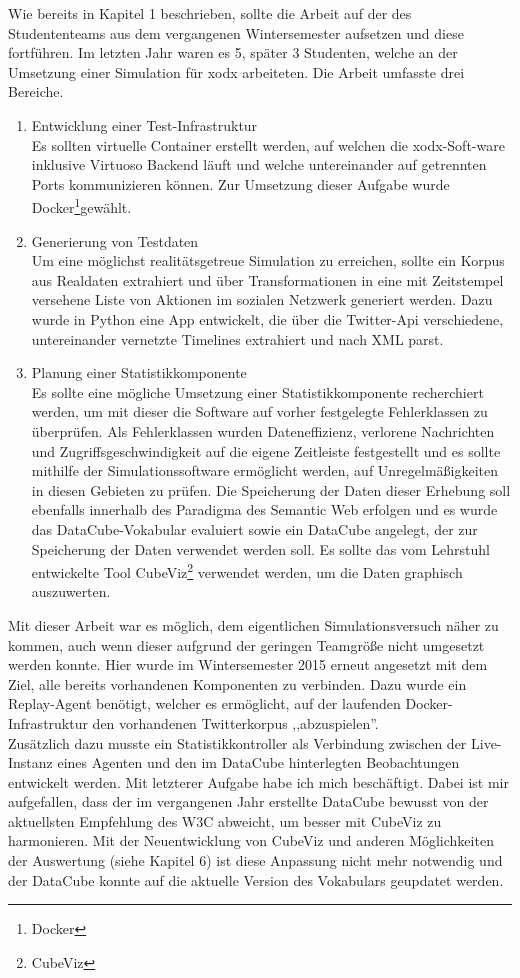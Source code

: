 \documentclass{article}
\begin{document}
Wie bereits in Kapitel 1 beschrieben, sollte die Arbeit auf der des Studententeams aus dem vergangenen Wintersemester aufsetzen und diese fortführen. Im letzten Jahr waren es 5, später 3 Studenten, welche an der Umsetzung einer Simulation für xodx arbeiteten. Die Arbeit umfasste drei Bereiche.
\begin{enumerate}
	\item{Entwicklung einer Test-Infrastruktur\\
	Es sollten virtuelle Container erstellt werden, auf welchen die xodx-Soft-ware inklusive Virtuoso Backend läuft und welche untereinander auf getrennten Ports kommunizieren können. Zur Umsetzung dieser Aufgabe wurde Docker\footnote{Docker}gewählt.}
	\item{Generierung von Testdaten\\
	Um eine möglichst realitätsgetreue Simulation zu erreichen, sollte ein Korpus aus Realdaten extrahiert und über Transformationen in eine mit Zeitstempel versehene Liste von Aktionen im sozialen Netzwerk generiert werden. Dazu wurde in Python eine App entwickelt, die über die Twitter-Api verschiedene, untereinander vernetzte Timelines extrahiert und nach XML parst.}
	\item{Planung einer Statistikkomponente\\
	Es sollte eine mögliche Umsetzung einer Statistikkomponente  recherchiert werden, um mit dieser die Software auf vorher festgelegte Fehlerklassen zu überprüfen. Als Fehlerklassen wurden Dateneffizienz, verlorene Nachrichten und Zugriffsgeschwindigkeit auf die eigene Zeitleiste festgestellt und es sollte mithilfe der Simulationssoftware ermöglicht werden, auf Unregelmäßigkeiten in diesen Gebieten zu prüfen. Die Speicherung der Daten dieser Erhebung soll ebenfalls innerhalb des Paradigma des Semantic Web erfolgen und es wurde das DataCube-Vokabular evaluiert sowie ein DataCube angelegt, der zur Speicherung der Daten verwendet werden soll. Es sollte das vom Lehrstuhl entwickelte Tool CubeViz\footnote{CubeViz} verwendet werden, um die Daten graphisch auszuwerten.}
\end{enumerate}
Mit dieser Arbeit war es möglich, dem eigentlichen Simulationsversuch näher zu kommen, auch wenn dieser aufgrund der geringen Teamgröße nicht umgesetzt werden konnte. Hier wurde im Wintersemester 2015 erneut angesetzt mit dem Ziel, alle bereits vorhandenen Komponenten zu verbinden. Dazu wurde ein Replay-Agent benötigt, welcher es ermöglicht, auf der laufenden Docker-Infrastruktur den vorhandenen Twitterkorpus ,,abzuspielen''.\\
 Zusätzlich dazu musste ein Statistikkontroller als Verbindung zwischen der Live-Instanz eines Agenten und den im DataCube hinterlegten Beobachtungen entwickelt werden. Mit letzterer Aufgabe habe ich mich beschäftigt. Dabei ist mir aufgefallen, dass der im vergangenen Jahr erstellte DataCube bewusst von der aktuellsten Empfehlung des W3C abweicht, um besser mit CubeViz zu harmonieren. Mit der Neuentwicklung von CubeViz und anderen Möglichkeiten der Auswertung (siehe Kapitel 6) ist diese Anpassung nicht mehr notwendig und der DataCube konnte auf die aktuelle Version des Vokabulars geupdatet werden.
\end{document}
